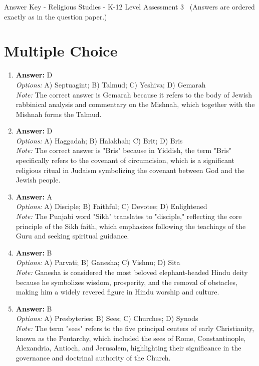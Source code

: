 \documentclass[12pt]{article}
\begin{document}
\begin{center}
Answer Key - Religious Studies - K-12 Level Assessment 3 \
\small (Answers are ordered exactly as in the question paper.)
\end{center}

\section*{Multiple Choice}
\begin{enumerate}[label=\arabic*.]
\item \textbf{Answer:} D
\\ \textit{Options:} A) Septuagint; B) Talmud; C) Yeshiva; D) Gemarah
\\ \textit{Note:} The correct answer is Gemarah because it refers to the body of Jewish rabbinical analysis and commentary on the Mishnah, which together with the Mishnah forms the Talmud.
\item \textbf{Answer:} D
\\ \textit{Options:} A) Haggadah; B) Halakhah; C) Brit; D) Bris
\\ \textit{Note:} The correct answer is "Bris" because in Yiddish, the term "Bris" specifically refers to the covenant of circumcision, which is a significant religious ritual in Judaism symbolizing the covenant between God and the Jewish people.
\item \textbf{Answer:} A
\\ \textit{Options:} A) Disciple; B) Faithful; C) Devotee; D) Enlightened
\\ \textit{Note:} The Punjabi word "Sikh" translates to "disciple," reflecting the core principle of the Sikh faith, which emphasizes following the teachings of the Guru and seeking spiritual guidance.
\item \textbf{Answer:} B
\\ \textit{Options:} A) Parvati; B) Ganesha; C) Vishnu; D) Sita
\\ \textit{Note:} Ganesha is considered the most beloved elephant-headed Hindu deity because he symbolizes wisdom, prosperity, and the removal of obstacles, making him a widely revered figure in Hindu worship and culture.
\item \textbf{Answer:} B
\\ \textit{Options:} A) Presbyteries; B) Sees; C) Churches; D) Synods
\\ \textit{Note:} The term "sees" refers to the five principal centers of early Christianity, known as the Pentarchy, which included the sees of Rome, Constantinople, Alexandria, Antioch, and Jerusalem, highlighting their significance in the governance and doctrinal authority of the Church.
\end{enumerate}
\end{document}
